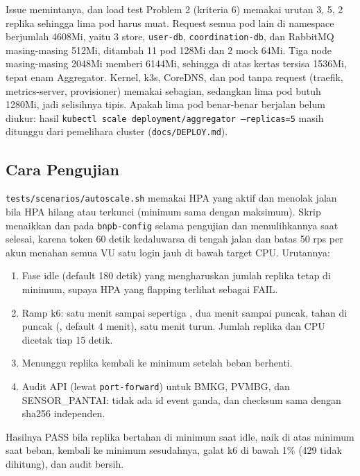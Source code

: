 Issue memintanya, dan load test Problem 2 (kriteria 6) memakai urutan 3, 5, 2 replika sehingga lima pod harus muat. Request semua pod lain di namespace berjumlah 4608Mi, yaitu 3 store, \texttt{user-db}, \texttt{coordination-db}, dan RabbitMQ masing-masing 512Mi, ditambah 11 pod 128Mi dan 2 mock 64Mi. Tiga node masing-masing 2048Mi memberi 6144Mi, sehingga di atas kertas tersisa 1536Mi, tepat enam Aggregator. Kernel, k3s, CoreDNS, dan pod tanpa request (traefik, metrics-server, provisioner) memakai sebagian, sedangkan lima pod butuh 1280Mi, jadi selisihnya tipis. Apakah lima pod benar-benar berjalan belum diukur: hasil \texttt{kubectl scale deployment/aggregator --replicas=5} masih ditunggu dari pemelihara cluster (\texttt{docs/DEPLOY.md}). 

\subsection{Cara Pengujian}

\texttt{tests/scenarios/autoscale.sh} memakai HPA yang aktif dan menolak jalan bila HPA hilang atau terkunci (minimum sama dengan maksimum). Skrip menaikkan  dan  pada \texttt{bnpb-config} selama pengujian dan memulihkannya saat selesai, karena token 60 detik kedaluwarsa di tengah jalan dan batas 50 rps per akun menahan semua VU satu login jauh di bawah target CPU. Urutannya:

\begin{enumerate}
\tightlist
\item
  Fase idle (default 180 detik) yang mengharuskan jumlah replika tetap di minimum, supaya HPA yang flapping terlihat sebagai FAIL.
\item
  Ramp k6: satu menit sampai sepertiga , dua menit sampai puncak, tahan di puncak (, default 4 menit), satu menit turun. Jumlah replika dan CPU dicetak tiap 15 detik.
\item
  Menunggu replika kembali ke minimum setelah beban berhenti.
\item
  Audit API (lewat \texttt{port-forward}) untuk BMKG, PVMBG, dan SENSOR\_PANTAI: tidak ada id event ganda, dan checksum sama dengan sha256 independen.
\end{enumerate}

Hasilnya PASS bila replika bertahan di minimum saat idle, naik di atas minimum saat beban, kembali ke minimum sesudahnya, galat k6 di bawah 1\% (429 tidak dihitung), dan audit bersih.

